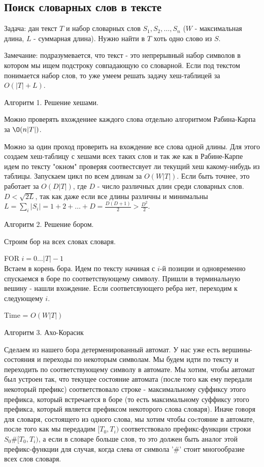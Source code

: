 \subsection{Поиск словарных слов в тексте}

Задача: дан текст $T$ и набор словарных слов $S_1, S_2, \dots, S_n$ ($W$ - максимальная длина, $L$ - суммарная длина). Нужно найти в $T$ хоть одно слово из $S$.

Замечание: подразумевается, что текст - это непрерывный набор символов в котором мы ищем подстроку совпадающую со словарной. Если под текстом понимается набор слов, то уже умеем решать задачу хеш-таблицей за $O(|T| + L)$.

Алгоритм 1. Решение хешами.

Можно проверять вхождениее каждого слова отдельно алгоритмом Рабина-Карпа за $\O(n |T|)$.

Можно за один проход проверить на вхождение все слова одной длины. Для этого создаем хеш-таблицу с хешами всех таких слов и так же как в Рабине-Карпе идем по тексту "окном" проверяя соотвестсвует ли текущий хеш какому-нибудь из таблицы. Запускаем цикл по всем длинам за $O(W |T|)$. Если быть точнее, это работает за $O(D |T|)$, где $D$ - число различных длин среди словарных слов. $D < \sqrt{2 L}$, так как даже если все длины различны и минимальны $L = \sum_i |S_i| = 1 + 2 + \dots + D = \frac{D (D + 1)}{2} > \frac{D^2}{2}$.

Алгоритм 2. Решение бором.

Строим бор на всех словах словаря.

FOR $i = 0 \dots |T| - 1$\\
Встаем в корень бора. Идем по тексту начиная с $i$-й позиции и одновременно спускаемся в боре по соответствующему символу. Пришли в терминальную вешину - нашли вхождение. Если соответсвующего ребра нет, переходим к следующему $i$.

Time =  $O(W |T|)$

Алгоритм 3. Ахо-Корасик

Сделаем из нашего бора детерменированный автомат. У нас уже есть вершины-состояния и переходы по некоторым символам. Мы будем идти по тексту и переходить по соответствующему символу в автомате. Мы хотим, чтобы автомат был устроен так, что текущее состояние автомата (после того как ему передали некоторый префикс) соответствовало строке - максимальному суффиксу этого префикса, который встречается в боре (то есть максимальному суффиксу этого префикса, который является префиксом некоторого слова словаря). Иначе говоря для словаря, состоящего из одного слова, мы хотим чтобы соcтояние в автомате, после того как мы передадим $[T_0, T_i)$ соответствовало префикс-функции строки $S_0\#[T_0, T_i)$, а если в словаре больше слов, то это должен быть аналог этой префикс-функции для случая, когда слева от символа '\#' стоит многообразие всех слов словаря.

